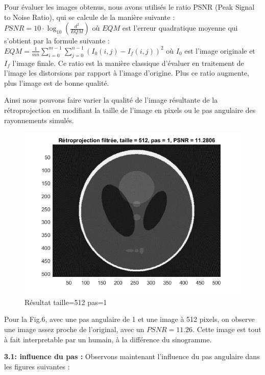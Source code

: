 \documentclass[conference]{IEEEtran}
\begin{document}
Pour évaluer les images obtenus, nous avons utilisés le ratio PSNR (Peak Signal to Noise Ratio), qui se calcule de la manière suivante :
$PSNR=10\cdot\log_{10} (\frac{d^2}{EQM})$
où $EQM$ est l'erreur quadratique moyenne qui s'obtient par la formule suivante :
$EQM=\frac{1}{mn}\sum_{i=0}^{m-1}\sum_{j=0}^{n-1}(I_0(i,j)-I_f(i,j))^2$
où $I_0$ est l'image originale et $I_f$ l'image finale.
Ce ratio est la manière classique d'évaluer en traitement de l'image les distorsions par rapport à l'image d'origine. Plus ce ratio augmente, plus l'image est de bonne qualité.

Ainsi nous pouvons faire varier la qualité de l'image résultante de la rétroprojection en modifiant la taille de l'image en pixels ou le pas angulaire des rayonnements simulés.

\begin{figure}[H]
\centering
\includegraphics[scale=0.5]{t512-p1}
	\caption[Résultat taille=512 pas=1]{Résultat taille=512 pas=1}
\label{fig:gallery}
\end{figure}

Pour la Fig.6, avec une pas angulaire de 1 et une image à 512 pixels, on observe une image assez proche de l'original, avec un $PSNR=11.26$. Cette image est tout à fait interpretable par un humain, à la différence du sinogramme.

\textbf{3.1: influence du pas :}
Observons maintenant l'influence du pas angulaire dans les figures suivantes :
\end{document}

